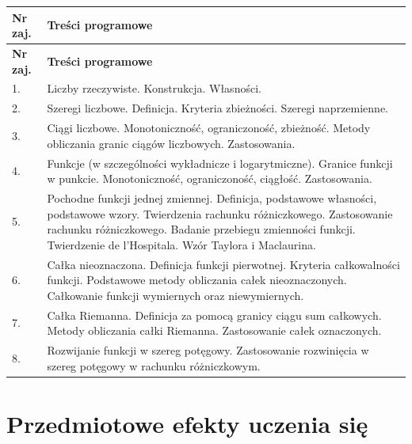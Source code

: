 \documentclass[12pt, a4paper]{article}
\newcommand{\thdrule}{\noalign{\global\setlength{\extrarowheight}{0pt}}}
\newcommand{\thdend}{\noalign{\global\setlength{\extrarowheight}{3pt}}}
\begin{document}
{\scriptsize
\begin{longtable}{m{1.5cm}m{14.5cm}}
\thdrule\toprule
\rowcolor{pjatkRed} {\color{white}\textbf{Nr zaj.}} & {\color{white}\textbf{Treści programowe}} \\
\midrule\thdend
\endfirsthead
\thdrule\toprule
\rowcolor{pjatkRed} {\color{white}\textbf{Nr zaj.}} & {\color{white}\textbf{Treści programowe}} \\
\midrule\thdend
\endhead
  \rowcolor{tableRowLight} 1. & Liczby rzeczywiste. Konstrukcja. Własności. \\
  \rowcolor{tableRowAlt} 2. & Szeregi liczbowe. Definicja. Kryteria zbieżności. Szeregi naprzemienne. \\
  \rowcolor{tableRowLight} 3. & Ciągi liczbowe. Monotoniczność, ograniczoność, zbieżność. Metody obliczania granic ciągów liczbowych. Zastosowania. \\
  \rowcolor{tableRowAlt} 4. & Funkcje (w szczególności wykładnicze i logarytmiczne).  Granice funkcji w punkcie. Monotoniczność, ograniczoność, ciągłość. Zastosowania. \\
  \rowcolor{tableRowLight} 5. & Pochodne funkcji jednej zmiennej. Definicja, podstawowe własności, podstawowe wzory.  Twierdzenia rachunku różniczkowego. Zastosowanie rachunku różniczkowego. Badanie przebiegu zmienności funkcji. Twierdzenie de l’Hospitala.  Wzór Taylora i Maclaurina. \\
  \rowcolor{tableRowAlt} 6. & Całka nieoznaczona. Definicja funkcji pierwotnej. Kryteria całkowalności funkcji. Podstawowe metody obliczania całek nieoznaczonych. Całkowanie funkcji wymiernych oraz niewymiernych. \\
  \rowcolor{tableRowLight} 7. & Całka Riemanna. Definicja za pomocą granicy ciągu sum całkowych. Metody obliczania całki Riemanna. Zastosowanie całek oznaczonych. \\
  \rowcolor{tableRowAlt} 8. & Rozwijanie funkcji w szereg potęgowy. Zastosowanie rozwinięcia w szereg potęgowy w rachunku różniczkowym. \\
\bottomrule
\end{longtable}}

\section{Przedmiotowe efekty uczenia się}
\end{document}
